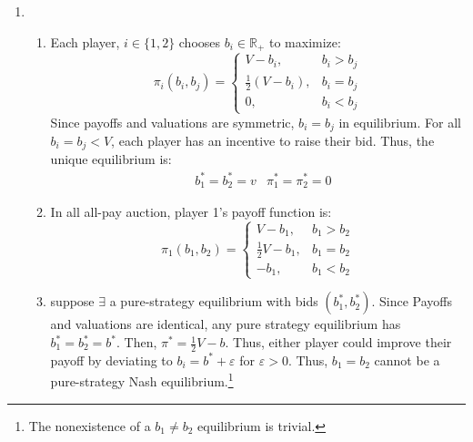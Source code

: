 \documentclass{article}
\newcommand{\R}{\mathbb{R}}
\begin{document}
\begin{enumerate}
        \item  
          \begin{enumerate}
            \item Each player, $i\in\{1,2\}$ chooses $b_i\in\R_+$ to maximize: \[
              \pi_i(b_i,b_j) = \begin{cases}
                V-b_i,&b_i>b_j  \\
                \frac{1}{2}\left(V-b_i\right),&b_i=b_j \\
                0,&b_i<b_j
              \end{cases}
            \]
            Since payoffs and valuations are symmetric, $b_i=b_j$ in equilibrium. For all $b_i=b_j<V$, each player has an incentive to raise their bid. Thus, the unique equilibrium is:
            \begin{align*}
              &b_1^*=b_2^*=v & \pi_1^*=\pi_2^*=0
            \end{align*}

            \item In all all-pay auction, player 1's payoff function is: 
            \[
              \pi_1(b_1,b_2) = \begin{cases}
                V-b_1,&b_1>b_2  \\
                \frac{1}{2}V-b_1,&b_1=b_2 \\
                -b_1,&b_1<b_2
              \end{cases}
            \]

            \item suppose $\exists$ a pure-strategy equilibrium with bids $(b_1^*,b_2^*)$. Since Payoffs and valuations are identical, any pure strategy equilibrium has ${b_1^*=b_2^*=b^*}$. Then, ${\pi^*=\frac{1}{2}V-b}$. Thus, either player could improve their payoff by deviating to ${b_i = b^*+\varepsilon}$ for $\varepsilon>0$. Thus, $b_1=b_2$ cannot be a pure-strategy Nash equilibrium.\footnote{The nonexistence of a $b_1\neq b_2$ equilibrium is trivial.}


\end{enumerate}
\end{enumerate}
\end{document}
